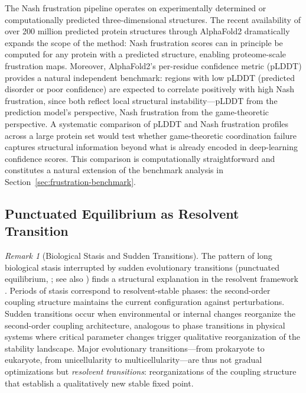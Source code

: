 \documentclass[12pt,a4paper]{article}
\theoremstyle{remark}
\newtheorem{remark}{Remark}
\begin{document}
The Nash frustration pipeline operates on experimentally determined or computationally predicted three-dimensional structures. The recent availability of over 200 million predicted protein structures through AlphaFold2 \citep{JumperAF2021} dramatically expands the scope of the method: Nash frustration scores can in principle be computed for any protein with a predicted structure, enabling proteome-scale frustration maps. Moreover, AlphaFold2's per-residue confidence metric (pLDDT) provides a natural independent benchmark: regions with low pLDDT (predicted disorder or poor confidence) are expected to correlate positively with high Nash frustration, since both reflect local structural instability---pLDDT from the prediction model's perspective, Nash frustration from the game-theoretic perspective. A systematic comparison of pLDDT and Nash frustration profiles across a large protein set would test whether game-theoretic coordination failure captures structural information beyond what is already encoded in deep-learning confidence scores. This comparison is computationally straightforward and constitutes a natural extension of the benchmark analysis in Section~\ref{sec:frustration-benchmark}.

\subsection{Punctuated Equilibrium as Resolvent Transition}

\begin{remark}[Biological Stasis and Sudden Transitions]
\label{rem:punctuated-equilibrium}
The pattern of long biological stasis interrupted by sudden evolutionary transitions (punctuated equilibrium, \citealp{GouldEldredge1977}; see also \citealp{KauffmanOrigins}) finds a structural explanation in the resolvent framework \citep{GeigerRH2026b}. Periods of stasis correspond to resolvent-stable phases: the second-order coupling structure maintains the current configuration against perturbations. Sudden transitions occur when environmental or internal changes reorganize the second-order coupling architecture, analogous to phase transitions in physical systems where critical parameter changes trigger qualitative reorganization of the stability landscape. Major evolutionary transitions---from prokaryote to eukaryote, from unicellularity to multicellularity---are thus not gradual optimizations but \emph{resolvent transitions}: reorganizations of the coupling structure that establish a qualitatively new stable fixed point.
\end{remark}
\end{document}
